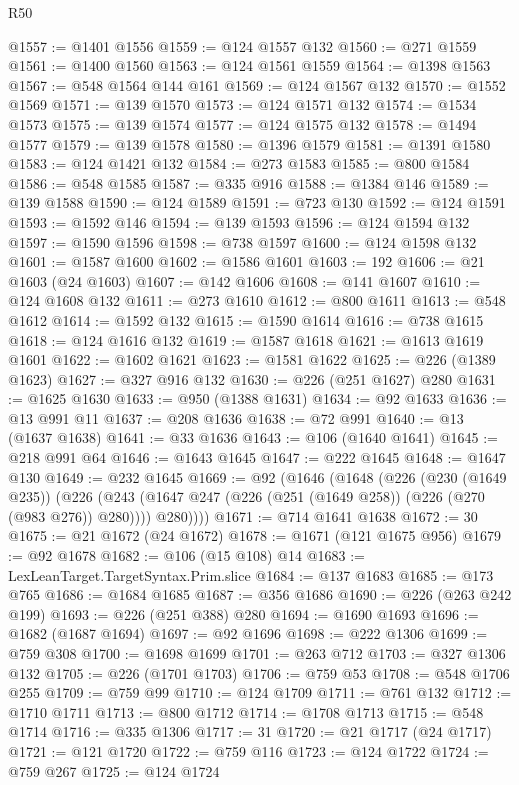 \begin{lexlean}{R50}
\begin{coremodule}
{{{{{{{{{{{{{{{{{{{{{{{{{{{{{{{{{{{{{{{{{{{{{{{{{{{{{{{{{{{{@1557 := @1401 @1556
@1559 := @124 @1557 @132
@1560 := @271 @1559
@1561 := @1400 @1560
@1563 := @124 @1561 @1559
@1564 := @1398 @1563
@1567 := @548 @1564 @144 @161
@1569 := @124 @1567 @132
@1570 := @1552 @1569
@1571 := @139 @1570
@1573 := @124 @1571 @132
@1574 := @1534 @1573
@1575 := @139 @1574
@1577 := @124 @1575 @132
@1578 := @1494 @1577
@1579 := @139 @1578
@1580 := @1396 @1579
@1581 := @1391 @1580
@1583 := @124 @1421 @132
@1584 := @273 @1583
@1585 := @800 @1584
@1586 := @548 @1585
@1587 := @335 @916
@1588 := @1384 @146
@1589 := @139 @1588
@1590 := @124 @1589
@1591 := @723 @130
@1592 := @124 @1591
@1593 := @1592 @146
@1594 := @139 @1593
@1596 := @124 @1594 @132
@1597 := @1590 @1596
@1598 := @738 @1597
@1600 := @124 @1598 @132
@1601 := @1587 @1600
@1602 := @1586 @1601
@1603 := 192
@1606 := @21 @1603 (@24 @1603)
@1607 := @142 @1606
@1608 := @141 @1607
@1610 := @124 @1608 @132
@1611 := @273 @1610
@1612 := @800 @1611
@1613 := @548 @1612
@1614 := @1592 @132
@1615 := @1590 @1614
@1616 := @738 @1615
@1618 := @124 @1616 @132
@1619 := @1587 @1618
@1621 := @1613 @1619 @1601
@1622 := @1602 @1621
@1623 := @1581 @1622
@1625 := @226 (@1389 @1623)
@1627 := @327 @916 @132
@1630 := @226 (@251 @1627) @280
@1631 := @1625 @1630
@1633 := @950 (@1388 @1631)
@1634 := @92 @1633
@1636 := @13 @991 @11
@1637 := @208 @1636
@1638 := @72 @991
@1640 := @13 (@1637 @1638)
@1641 := @33 @1636
@1643 := @106 (@1640 @1641)
@1645 := @218 @991 @64
@1646 := @1643 @1645
@1647 := @222 @1645
@1648 := @1647 @130
@1649 := @232 @1645
@1669 := @92
    (@1646
      (@1648
        (@226
          (@230 (@1649 @235))
          (@226
            (@243 (@1647 @247 (@226 (@251 (@1649 @258)) (@226 (@270 (@983 @276)) @280))))
            @280))))
@1671 := @714 @1641 @1638
@1672 := 30
@1675 := @21 @1672 (@24 @1672)
@1678 := @1671 (@121 @1675 @956)
@1679 := @92 @1678
@1682 := @106 (@15 @108) @14
@1683 := LexLeanTarget.TargetSyntax.Prim.slice
@1684 := @137 @1683
@1685 := @173 @765
@1686 := @1684 @1685
@1687 := @356 @1686
@1690 := @226 (@263 @242 @199)
@1693 := @226 (@251 @388) @280
@1694 := @1690 @1693
@1696 := @1682 (@1687 @1694)
@1697 := @92 @1696
@1698 := @222 @1306
@1699 := @759 @308
@1700 := @1698 @1699
@1701 := @263 @712
@1703 := @327 @1306 @132
@1705 := @226 (@1701 @1703)
@1706 := @759 @53
@1708 := @548 @1706 @255
@1709 := @759 @99
@1710 := @124 @1709
@1711 := @761 @132
@1712 := @1710 @1711
@1713 := @800 @1712
@1714 := @1708 @1713
@1715 := @548 @1714
@1716 := @335 @1306
@1717 := 31
@1720 := @21 @1717 (@24 @1717)
@1721 := @121 @1720
@1722 := @759 @116
@1723 := @124 @1722
@1724 := @759 @267
@1725 := @124 @1724
}}}}}}}}}}}}}}}}}}}}}}}}}}}}}}}}}}}}}}}}}}}}}}}}}}}}}}}}}}}}
\end{coremodule}
\end{lexlean}

